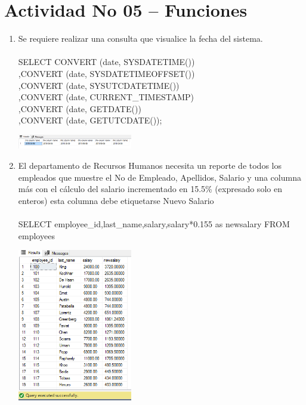 \section{Actividad No 05 – Funciones}
	
\begin{enumerate}[1.]
	\item Se requiere realizar una consulta que visualice la fecha del sistema.
	\\
	\\SELECT CONVERT (date, SYSDATETIME())
	\\,CONVERT (date, SYSDATETIMEOFFSET())
	\\,CONVERT (date, SYSUTCDATETIME())
	\\,CONVERT (date, CURRENT\_TIMESTAMP)
	\\,CONVERT (date, GETDATE())
    	\\,CONVERT (date, GETUTCDATE());
	\begin{center}
	\includegraphics[width=5cm]{./Imagenes/actividad_05_01}
	\end{center}
	
	\item El departamento de Recursos Humanos necesita un reporte de todos los empleados que muestre el No de Empleado, Apellidos, Salario y una columna más con el cálculo del salario incrementado en 15.5\% (expresado solo en enteros) esta columna debe etiquetarse Nuevo Salario
	\\
	\\SELECT employee\_id,last\_name,salary,salary*0.155 as newsalary FROM employees
	\begin{center}
	\includegraphics[width=5cm]{./Imagenes/actividad_05_02}
	\end{center}


\end{enumerate}
